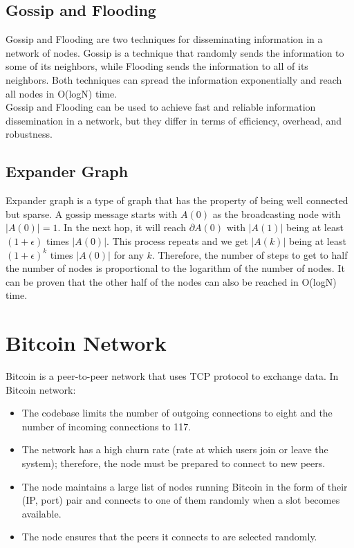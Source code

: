 \subsection{Gossip and Flooding}
Gossip and Flooding are two techniques for disseminating information in a network of nodes. Gossip is a technique that randomly sends the information to some of its neighbors, while Flooding sends the information to all of its neighbors. Both techniques can spread the information exponentially and reach all nodes in O(logN) time.\\
Gossip and Flooding can be used to achieve fast and reliable information dissemination in a network, but they differ in terms of efficiency, overhead, and robustness.
\subsection{Expander Graph}
Expander graph is a type of graph that has the property of being well connected but sparse. 
A gossip message starts with $A(0)$ as the broadcasting node with $|A(0)| = 1$. In the next hop, it will reach $\partial A(0)$ with $|A(1)|$ being at least $(1 + \epsilon)$ times $|A(0)|$. This process repeats and we get $|A(k)|$ being at least $(1 + \epsilon)^k$ times $|A(0)|$ for any $k$. Therefore, the number of steps to get to half the number of nodes is proportional to the logarithm of the number of nodes. It can be proven that the other half of the nodes can also be reached in O(logN) time.

\section{Bitcoin Network}
Bitcoin is a peer-to-peer network that uses TCP protocol to exchange data. In Bitcoin network:
\begin{itemize}
	\item The codebase limits the number of outgoing connections to eight and the number of incoming connections to 117.
	\item The network has a high churn rate (rate at which users join or leave the system); therefore, the node must be prepared to connect to new peers.
	\item The node maintains a large list of nodes running Bitcoin in the form of their (IP, port) pair and connects to one of them randomly when a slot becomes available.
	\item The node ensures that the peers it connects to are selected randomly.
\end{itemize}

